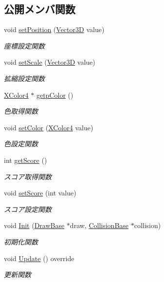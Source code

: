 \subsection*{公開メンバ関数}
\begin{DoxyCompactItemize}
\item 
void \mbox{\hyperlink{class_scaffold_a690990d17bc8f44a4f0d675d7f6bbd1f}{set\+Position}} (\mbox{\hyperlink{class_vector3_d}{Vector3D}} value)
\begin{DoxyCompactList}\small\item\em 座標設定関数 \end{DoxyCompactList}\item 
void \mbox{\hyperlink{class_scaffold_a4527e7788208160d95369672f5cc4e25}{set\+Scale}} (\mbox{\hyperlink{class_vector3_d}{Vector3D}} value)
\begin{DoxyCompactList}\small\item\em 拡縮設定関数 \end{DoxyCompactList}\item 
\mbox{\hyperlink{_vector3_d_8h_a680c30c4a07d86fe763c7e01169cd6cc}{X\+Color4}} $\ast$ \mbox{\hyperlink{class_scaffold_aafdfc19bcd0080b91dfbb2432b86a93d}{getp\+Color}} ()
\begin{DoxyCompactList}\small\item\em 色取得関数 \end{DoxyCompactList}\item 
void \mbox{\hyperlink{class_scaffold_ae30cf2eeec8239b53aedaf3aa4c7606c}{set\+Color}} (\mbox{\hyperlink{_vector3_d_8h_a680c30c4a07d86fe763c7e01169cd6cc}{X\+Color4}} value)
\begin{DoxyCompactList}\small\item\em 色設定関数 \end{DoxyCompactList}\item 
int \mbox{\hyperlink{class_scaffold_a57ebf7f07d9e8fc6bf941eb2c720f001}{get\+Score}} ()
\begin{DoxyCompactList}\small\item\em スコア取得関数 \end{DoxyCompactList}\item 
void \mbox{\hyperlink{class_scaffold_a6e5a9d4c75b48b31e265c30e2c9712a4}{set\+Score}} (int value)
\begin{DoxyCompactList}\small\item\em スコア設定関数 \end{DoxyCompactList}\item 
void \mbox{\hyperlink{class_scaffold_a7781f0c0fcde243975f1077540e0b981}{Init}} (\mbox{\hyperlink{class_draw_base}{Draw\+Base}} $\ast$draw, \mbox{\hyperlink{class_collision_base}{Collision\+Base}} $\ast$collision)
\begin{DoxyCompactList}\small\item\em 初期化関数 \end{DoxyCompactList}\item 
void \mbox{\hyperlink{class_scaffold_a0799d380645a9d4e92dfd90f6bb6f9e9}{Update}} () override
\begin{DoxyCompactList}\small\item\em 更新関数 \end{DoxyCompactList}\end{DoxyCompactItemize}

